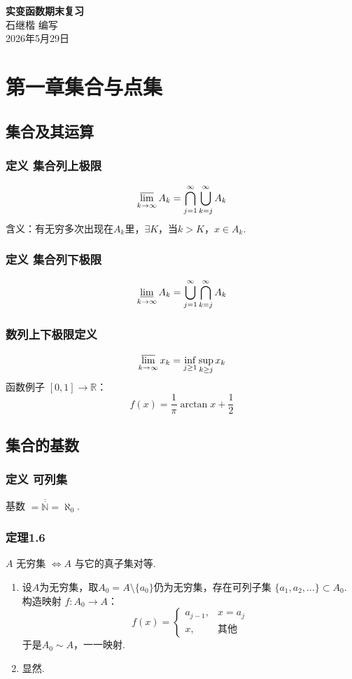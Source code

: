 \documentclass{article}
\begin{document}
	
	\begin{center}
		{\LARGE \textbf{实变函数期末复习}} \\[0.5cm]
		{\large {\kaishu 石继楷 \quad 编写}} \\[0.3cm]
		{\large 2026年5月29日}
	\end{center}
	
	\section{第一章\quad 集合与点集}
	\subsection{集合及其运算}
	\subsubsection{定义 集合列上极限}
	\[
	\displaystyle \varlimsup_{k\to\infty} A_k = \bigcap_{j=1}^{\infty} \bigcup_{k=j}^{\infty} A_k
	\]
	含义：有无穷多次出现在$A_k$里，$\exists K$，当$k>K$，$x\in A_k$.
	
	\subsubsection{定义 集合列下极限}
	\[
	\displaystyle \varliminf_{k\to\infty} A_k = \bigcup_{j=1}^{\infty} \bigcap_{k=j}^{\infty} A_k
	\]
	
	\subsubsection{数列上下极限定义}
	\[
	\displaystyle \varlimsup_{k\to\infty} x_k = \inf_{j\ge1}\sup_{k\ge j}x_k
	\]
	函数例子 $[0,1]\to\mathbb{R}$：
	\[
	f(x)=\frac1\pi \arctan x + \frac12
	\]
	
	\subsection{集合的基数}
	\subsubsection{定义 可列集}
	基数 $=\overline{\overline{\mathbb{N}}}=\aleph_0$.
	
	\subsubsection{定理1.6}
	$A$ 无穷集 $\iff A$ 与它的真子集对等.
	\begin{enumerate}
		\item[$\Rightarrow$] 设$A$为无穷集，取$A_0=A\setminus\{a_0\}$仍为无穷集，存在可列子集 $\{a_1,a_2,\dots\}\subset A_0$.
		构造映射 $f:A_0\to A$：
		\[
		f(x)=
		\begin{cases}
			a_{j-1},& x=a_j\\
			x,& \text{其他}
		\end{cases}
		\]
		于是$A_0\sim A$，一一映射.
		\item[$\Leftarrow$] 显然.
	\end{enumerate}
	
\end{document}

